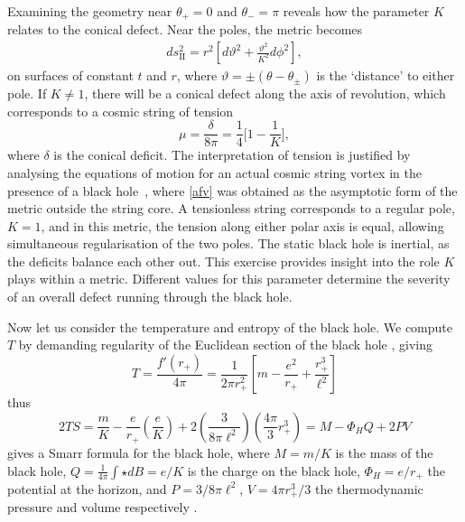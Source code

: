 \documentclass[
twoside,
openright,
frontopenright
]{dmathesis}
\begin{document}
Examining the geometry near $\theta_+ = 0$ and $\theta_- = \pi$ reveals how the
parameter $K$ relates to the conical defect. Near the poles, the metric becomes
\begin{align}
ds_{\mathrm{II}}^2 = r^2 \left[ d\vartheta^2 + \frac{\vartheta^2}{K^2} d\phi^2\right],
\end{align}
on surfaces of constant $t$ and $r$, where
$\vartheta = \pm (\theta - \theta_\pm)$ is the `distance' to either pole. If
$K\neq 1$, there will be a conical defect along the axis of revolution, which
corresponds to a cosmic string of tension
\begin{equation}
\mu = \frac{\delta}{8\pi} = \frac14 \bigg[1-\frac{1}{K}\bigg],
\label{afvtension}
\end{equation}
where $\delta$ is the conical deficit. The interpretation of tension is
justified by analysing the equations of motion for an actual cosmic string
vortex in the presence of a black hole~\cite{Achucarro:1995nu}, where
\eqref{afv} was obtained as the asymptotic form of the metric outside the string
core.  A tensionless string corresponds to a regular pole, $K=1$, and in this
metric, the tension along either polar axis is equal, allowing simultaneous
regularisation of the two poles. The static black hole is inertial, as the
deficits balance each other out. This exercise provides insight into the role
$K$ plays within a metric. Different values for this parameter determine the
severity of an overall defect running through the black hole.

Now let us consider the temperature and entropy of the black hole. We compute
$T$ by demanding regularity of the Euclidean section of the black hole
\cite{Gibbons:1976ue}, giving
\begin{equation}
T = \frac{f'(r_+)}{4\pi} = \frac{1}{2\pi r_+^2} \left [
m - \frac{e^2}{r_+} + \frac{r_+^3}{\ell^2}\right]
\end{equation}
thus 
\begin{equation}
2TS = \frac{m}{K} - \frac{e}{r_+}\left (\frac{e}{K} \right ) 
+ 2\left (\frac{3}{8\pi \ell^2} \right ) \left (\frac{4\pi}{3} r_+^3\right ) 
= M - \Phi_H Q + 2PV
\end{equation}
gives a Smarr formula \cite{Smarr:1972kt} for the black hole, where $M=m/K$ is
the mass of the black hole, $Q = \frac{1}{4\pi}
\int \star dB=e/K$ is the charge on the black hole, 
$\Phi_H = e/r_+$ the potential at the horizon, and $P = 3/8\pi \ell^2$, 
$V = 4\pi r_+^3/3$ the thermodynamic pressure and volume respectively 
\cite{Teitelboim:1985dp,Kastor:2009wy,Dolan:2010ha,Cvetic:2010jb,
Dolan:2011xt,Kubiznak:2012wp,Kubiznak:2016qmn}.
\end{document}
